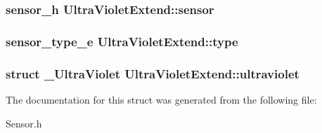 \subsubsection[{sensor}]{\setlength{\rightskip}{0pt plus 5cm}sensor\-\_\-h Ultra\-Violet\-Extend\-::sensor}\label{structUltraVioletExtend_ae2129bb3233f3f5cad3cf668b57bf830}
\subsubsection[{type}]{\setlength{\rightskip}{0pt plus 5cm}sensor\-\_\-type\-\_\-e Ultra\-Violet\-Extend\-::type}\label{structUltraVioletExtend_a1b43d62626aa06deb8788c40025d78fe}
\subsubsection[{ultraviolet}]{\setlength{\rightskip}{0pt plus 5cm}struct {\bf \-\_\-\-Ultra\-Violet} Ultra\-Violet\-Extend\-::ultraviolet}\label{structUltraVioletExtend_a4d209224ec618e4eff8019275b5b4590}


The documentation for this struct was generated from the following file\-:\begin{DoxyCompactItemize}
\item 
Sensor.\-h\end{DoxyCompactItemize}
